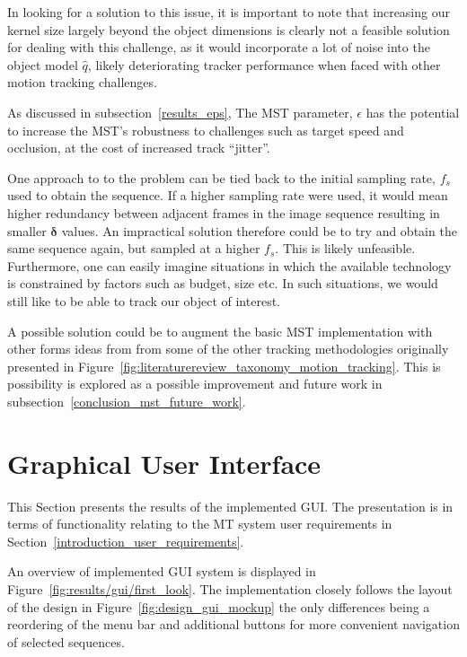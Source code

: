 In looking for a solution to this issue, it is important to note that increasing
our kernel size largely beyond the object dimensions is clearly not a feasible solution
for dealing with this challenge, as it would incorporate a lot of noise into the
object model $\hat{q}$, likely deteriorating tracker performance when faced with
other motion tracking challenges.

As discussed in subsection~\ref{results_eps}, The MST parameter, $\epsilon$ has
the potential to increase the MST's robustness to challenges such as target
speed and occlusion, at the cost of increased track ``jitter''. 

One approach to to the problem can be tied back to the initial sampling rate,
$f_s$ used to obtain the sequence. If a higher sampling rate were used, it would
mean higher redundancy between adjacent frames in the image sequence resulting
in smaller $\mathbf{\delta}$ values. An impractical solution therefore could be to try
and obtain the same sequence again, but sampled at a higher $f_s$.
This is likely unfeasible. Furthermore, one can easily imagine situations in which the
available technology is constrained by factors such as budget, size etc. In such
situations, we would still like to be able to track our object of interest. 

A possible solution could be to augment the basic MST implementation with other
forms ideas from from some of the other tracking methodologies originally
presented in Figure~\ref{fig:literaturereview_taxonomy_motion_tracking}. This is
possibility is explored as a possible improvement and future work in
subsection~\ref{conclusion_mst_future_work}. 


\section{Graphical User Interface}\label{results_gui}
This Section presents the results of the implemented GUI. The presentation is in
terms of functionality relating to the MT system user requirements in
Section~\ref{introduction_user_requirements}.

An overview of implemented GUI system is displayed in
Figure~\ref{fig:results/gui/first_look}. The implementation closely follows the layout of the design in
Figure~\ref{fig:design_gui_mockup} the only differences being a reordering of
the menu bar and additional buttons for more convenient navigation of selected
sequences.


